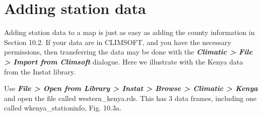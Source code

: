 \documentclass[
  letterpaper,
  DIV=11,
  numbers=noendperiod]{scrreprt}
\begin{document}
\section{Adding station data}\label{adding-station-data}

Adding station data to a map is just as easy as adding the county
information in Section 10.2. If your data are in CLIMSOFT, and you have
the necessary permissions, then transferring the data may be done with
the \textbf{\emph{Climatic \textgreater{} File \textgreater{} Import
from Climsoft}} dialogue. Here we illustrate with the Kenya data from
the Instat library.

Use \textbf{\emph{File \textgreater{} Open from Library \textgreater{}
Instat \textgreater{} Browse \textgreater{} Climatic \textgreater{}
Kenya}} and open the file called western\_kenya.rds. This has 3 data
frames, including one called wkenya\_stationinfo, Fig. 10.3a.
\end{document}
